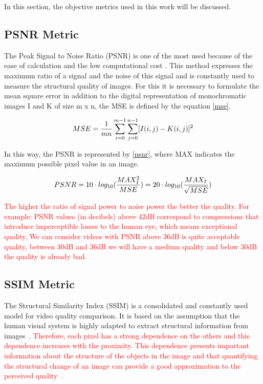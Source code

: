 \documentclass[journal]{IEEEtran}
\begin{document}
In this section, the objective metrics used in this work will be discussed.

\subsection{PSNR Metric}

The Peak Signal to Noise Ratio (PSNR) is one of the most used because of the ease of calculation and the low computational cost \cite{danilo:15}. This method expresses the maximum ratio of a signal and the noise of this signal and is constantly used to measure the structural quality of images. For this it is necessary to formulate the mean square error in addition to the digital representation of monochromatic images I and K of size m x n, the MSE is defined by the equation \ref{mse}.

\begin{equation}
	\centering
	\label{mse}
	MSE=\frac{1}{mn}\sum_{i=0}^{m-1}\sum_{j=0}^{n-1}[I(i,j)-K(i,j)]^{2}
\end{equation}

In this way, the PSNR is represented by \ref{psnr}, where MAX indicates the maximum possible pixel value in an image.

\begin{equation}
	\centering
	\label{psnr}
	PSNR = 10 \cdot log_{10}(\frac{MAX^{2}_{I}}{MSE}) = 20 \cdot log_{10}(\frac{MAX_{I}}{\sqrt{MSE}})  
\end{equation}

\textcolor{red}{
The higher the ratio of signal power to noise power the better the quality. For example: PSNR values (in decibels) above 42dB correspond to compressions that introduce imperceptible losses to the human eye, which means exceptional quality. We can consider videos with PSNR above 36dB is quite acceptable quality, between 30dB and 36dB we will have a medium quality and below 30dB the quality is already bad.
}

\subsection{SSIM Metric}


The Structural Similarity Index (SSIM) is a consolidated and constantly used model for video quality comparison. It is based on the assumption that the human visual system is highly adapted to extract structural information from images~\cite{danilo:12}. \textcolor{red}{ Therefore, each pixel has a strong dependence on the others and this dependence increases with the proximity. This dependence presents important information about the structure of the objects in the image and that quantifying the structural change of an image can provide a good approximation to the perceived quality~\cite{Wang:02}.}
\end{document}
